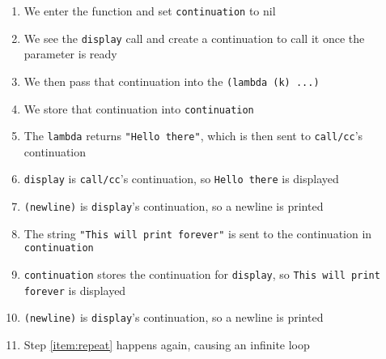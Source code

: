 \documentclass{article}
\begin{document}
\begin{enumerate}
\item{We enter the function and set {\tt continuation} to nil}
\item{We see the {\tt display} call and create a continuation to call it once the parameter is ready}
\item{We then pass that continuation into the {\tt (lambda (k) ...)}}
\item{We store that continuation into {\tt continuation}}
\item{The {\tt lambda} returns {\tt "Hello there"}, which is then sent to {\tt call/cc}'s continuation}
\item{{\tt display} is {\tt call/cc}'s continuation, so {\tt Hello there} is displayed}
\item{{\tt (newline)} is {\tt display}'s continuation, so a newline is printed}
\item{The string {\tt "This will print forever"} is sent to the continuation in {\tt continuation} \label{item:repeat}}
\item{{\tt continuation} stores the continuation for {\tt display}, so {\tt This will print forever} is displayed}
\item{{\tt (newline)} is {\tt display}'s continuation, so a newline is printed}
\item{Step \ref{item:repeat} happens again, causing an infinite loop}
\end{enumerate}
\end{document}

